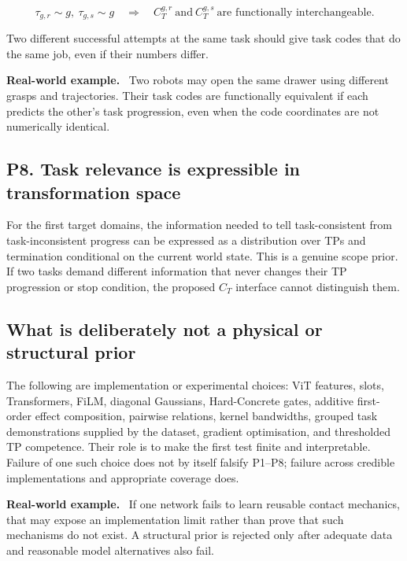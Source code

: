 \documentclass[11pt]{article}
\newenvironment{plainword}{%
  \par\medskip\noindent\begin{minipage}{\textwidth}%
  \color{gray!75!black}\small\itshape
}{%
  \end{minipage}\par\medskip}
\newenvironment{example}{%
  \par\smallskip\noindent\begin{minipage}{\textwidth}%
  \color{teal!60!black}\small
  \textbf{\color{teal!70!black}Real-world example.}\
}{%
  \end{minipage}\par\smallskip}
\begin{document}
\[
\boxed{\tau_{g,r}\sim g,\ \tau_{g,s}\sim g
\quad\Rightarrow\quad
C_T^{g,r}\ \text{and}\ C_T^{g,s}\ \text{are functionally interchangeable}.}
\]

\begin{plainword}
Two different successful attempts at the same task should give task codes that do the same job, even if their numbers differ.
\end{plainword}

\begin{example}
Two robots may open the same drawer using different grasps and trajectories. Their task codes are functionally equivalent if each
predicts the other's task progression, even when the code coordinates are not numerically identical.
\end{example}

\subsection*{P8. Task relevance is expressible in transformation space}

For the first target domains, the information needed to tell task-consistent from task-inconsistent progress can be expressed as a
distribution over TPs and termination conditional on the current world state. This is a genuine scope prior. If two tasks demand
different information that never changes their TP progression or stop condition, the proposed $C_T$ interface cannot distinguish
them.

\subsection*{What is deliberately not a physical or structural prior}

The following are implementation or experimental choices: ViT features, slots, Transformers, FiLM, diagonal Gaussians,
Hard-Concrete gates, additive first-order effect composition, pairwise relations, kernel bandwidths, grouped task demonstrations
supplied by the dataset, gradient optimisation, and thresholded TP competence. Their role is to make the first test finite and
interpretable. Failure of one such choice does not by itself falsify P1--P8; failure across credible implementations and appropriate
coverage does.

\begin{example}
If one network fails to learn reusable contact mechanics, that may expose an implementation limit rather than prove that such
mechanisms do not exist. A structural prior is rejected only after adequate data and reasonable model alternatives also fail.
\end{example}
\end{document}
